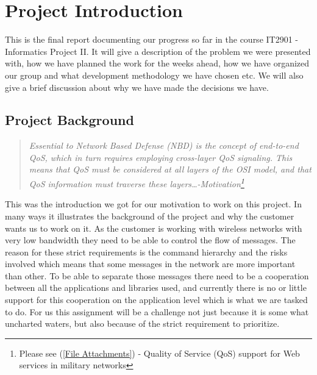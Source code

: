 \section{Project Introduction}\label{Project Introduction}
    This is the final report documenting our progress so far in the course IT2901 - Informatics Project II. It will give a description of the problem we were presented with, how we have planned the work for the weeks ahead, how we have organized our group and what development methodology we have chosen etc. We will also give a brief discussion about why we have made the decisions we have.
    
    \subsection{Project Background}\label{Project Background}
    \begin{quotation}
    \em Essential to Network Based Defense (NBD) is the concept of end-to-end QoS, which in turn requires employing cross-layer QoS signaling. This means that QoS must be considered at all layers of the OSI model, and that QoS information must traverse these layers\ldots -Motivation\footnote{Please see (\ref{File Attachments}) - Quality of Service (QoS) support for Web services in military networks}
    \end{quotation}
    This was the introduction we got for our motivation to work on this project. In many ways it illustrates the background of the project and why the customer wants us to work on it. As the customer is working with wireless networks with very low bandwidth they need to be able to control the flow of messages. The reason for these strict requirements is the command hierarchy and the risks involved which means that some messages in the network are more important than other. To be able to separate those messages there need to be a cooperation between all the applications and libraries used, and currently there is no or little support for this cooperation on the application level which is what we are tasked to do. For us this assignment will be a challenge not just because it is some what uncharted waters, but also because of the strict requirement to prioritize.

